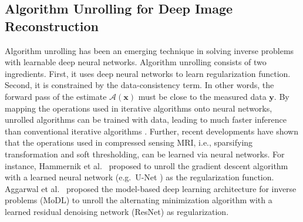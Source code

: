 \documentclass[journal,twoside,web]{ieeecolor}
\begin{document}
%


	\subsection{Algorithm Unrolling for Deep Image Reconstruction}

	Algorithm unrolling has been an emerging technique
	in solving inverse problems with learnable deep neural networks.
	Algorithm unrolling consists of two ingredients.
	First, it uses deep neural networks to learn regularization function.
	Second, it is constrained
	by the data-consistency term.
	In other words,
	the forward pass of the estimate $\mathcal{A} (\mathbf{x})$
	must be close to the measured data $\mathbf{y}$.
	By mapping the operations used in iterative algorithms
	onto neural networks, unrolled algorithms can be trained with data,
	leading to much faster inference
	than conventional iterative algorithms \cite{monga_2021_algunroll}.
	Further, recent developments have shown that
	the operations used in compressed sensing MRI,
	i.e., sparsifying transformation and soft thresholding,
	can be learned via neural networks.
	For instance, Hammernik et al.~\cite{hammernik_2018_varnet}
	proposed to unroll the gradient descent algorithm
	with a learned neural network
	(e.g.~U-Net \cite{ronneberger_2015_unet})
	as the regularization function.
	Aggarwal et al.~\cite{aggarwal_2018_modl} proposed
	the model-based deep learning architecture for inverse problems (MoDL)
	to unroll the alternating minimization algorithm
	with a learned residual denoising network (ResNet) \cite{he_2016_resnet}
	as regularization.
\end{document}
